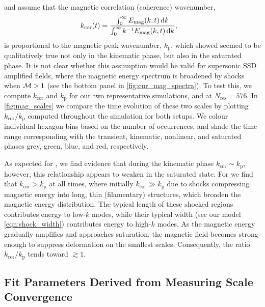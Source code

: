 \citet{schekochihin2004simulations} and \citet{galishnikova2022tearing} assume that the magnetic correlation (coherence) wavenumber,
\begin{align}
    k_\mathrm{cor}(t)
        &= \frac{
                \int_{0}^{\infty} E_\mathrm{mag}(k, t) \,\mathrm{d} k
            }{
                \int_{0}^{\infty} k^{-1} E_\mathrm{mag}(k, t) \,\mathrm{d} k
            }
        , \label{eqn:cor_scale}
\end{align}
is proportional to the magnetic peak wavenumber, $k_\mathrm{p}$, which \citet{beattie2022growth} showed seemed to be qualitatively true not only in the kinematic phase, but also in the saturated phase. It is not clear whether this assumption would be valid for supersonic SSD amplified fields, where the magnetic energy spectrum is broadened by shocks when $\mathcal{M} > 1$ (see the bottom panel in \autoref{fig:cur_mag_spectra}). To test this, we compute $k_\mathrm{cor}$ and $k_\mathrm{p}$ for our two representative simulations,  and  at $N_\mathrm{res} = 576$. In \autoref{fig:mag_scales} we compare the time evolution of these two scales by plotting $k_\mathrm{cor}/k_\mathrm{p}$ computed throughout the simulation for both setups. We colour individual hexagon-bins based on the number of occurrences, and shade the time range corresponding with the transient, kinematic, nonlinear, and saturated phases grey, green, blue, and red, respectively.

As expected for , we find evidence that during the kinematic phase $k_\mathrm{cor} \sim k_\mathrm{p}$, however, this relationship appears to weaken in the saturated state. For  we find that $k_\mathrm{cor} > k_\mathrm{p}$ at all times, where initially $k_\mathrm{cor} \gg k_\mathrm{p}$ due to shocks compressing magnetic energy into long, thin (\ie filamentary) structures, which broaden the magnetic energy distribution. The typical length of these shocked regions contributes energy to low-$k$ modes, while their typical width (see our model \autoref{eqn:shock_width}) contributes energy to high-$k$ modes. As the magnetic energy gradually amplifies and approaches saturation, the magnetic field becomes strong enough to suppress deformation on the smallest scales. Consequently, the ratio $k_\mathrm{cor} / k_\mathrm{p}$ tends toward $\gtrsim 1$.

\subsection{Fit Parameters Derived from Measuring Scale Convergence}

